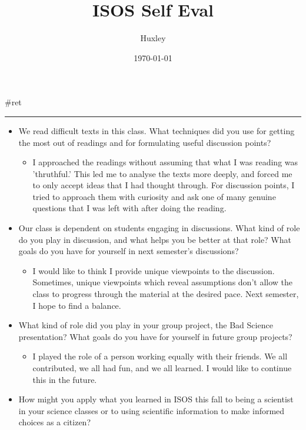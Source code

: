 \documentclass[letterpaper]{article}
\author{Huxley}
\date{\today}
\title{ISOS Self Eval}
\renewcommand\maketitle{}
\begin{document}
\maketitle
\#ret

\noindent\rule{\textwidth}{0.5pt}

\begin{itemize}
\item We read difficult texts in this class. What techniques did you use for
getting the most out of readings and for formulating useful discussion
points?

\begin{itemize}
\item I approached the readings without assuming that what I was reading
was 'thruthful.' This led me to analyse the texts more deeply, and
forced me to only accept ideas that I had thought through. For
discussion points, I tried to approach them with curiosity and ask
one of many genuine questions that I was left with after doing the
reading.
\end{itemize}

\item Our class is dependent on students engaging in discussions. What kind
of role do you play in discussion, and what helps you be better at
that role? What goals do you have for yourself in next semester's
discussions?

\begin{itemize}
\item I would like to think I provide unique viewpoints to the discussion.
Sometimes, unique viewpoints which reveal assumptions don't allow
the class to progress through the material at the desired pace. Next
semester, I hope to find a balance.
\end{itemize}

\item What kind of role did you play in your group project, the Bad Science
presentation? What goals do you have for yourself in future group
projects?

\begin{itemize}
\item I played the role of a person working equally with their friends. We
all contributed, we all had fun, and we all learned. I would like to
continue this in the future.
\end{itemize}

\item How might you apply what you learned in ISOS this fall to being a
scientist in your science classes or to using scientific information
to make informed choices as a citizen?


\end{itemize}
\end{document}
